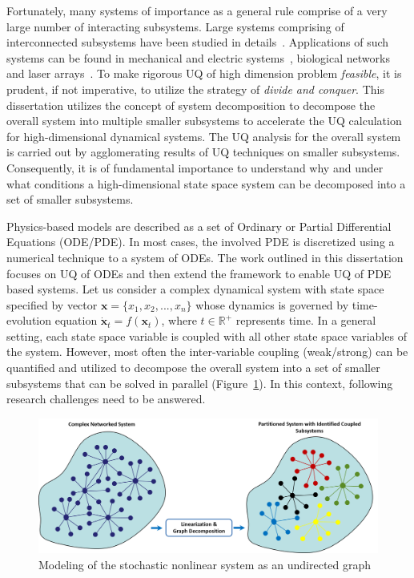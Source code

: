 Fortunately, many systems of importance as a general rule comprise of a very large number of interacting subsystems. Large systems comprising of interconnected subsystems have been studied in details~\cite{hale1997diffusive, afraimovich1997synchronization, fujisaka1983stability, martynyuk2012weakly}. Applications of such systems can be found in mechanical and electric systems~\cite{silver1967multiple, belykh1993chaotic, ji2012adaptive, georgiou2015multi}, biological networks~\cite{winfree1967biological, cohen1982nature, kopell1986symmetry, mirollo1990synchronization, ermentrout1998minimal} and laser arrays~\cite{winful1988stability, li1992preferential}. To make rigorous UQ of high dimension problem \textit{feasible}, it is prudent, if not imperative, to utilize the strategy of \textit{divide and conquer}. This dissertation utilizes the concept of system decomposition to decompose the overall system into multiple smaller subsystems to accelerate the UQ calculation for high-dimensional dynamical systems. The UQ analysis for the overall system is carried out by agglomerating results of UQ techniques on smaller subsystems. Consequently, it is of fundamental importance to understand why and under what conditions a high-dimensional state space system can be decomposed into a set of smaller subsystems. 

Physics-based models are described as a set of Ordinary or Partial Differential Equations (ODE/PDE). In most cases, the involved PDE is discretized using a numerical technique to a system of ODEs. The work outlined in this dissertation focuses on UQ of ODEs and then extend the framework to enable UQ of PDE based systems. 
Let us consider a complex dynamical system with state space specified by vector $\mathbf{x} = \{ x_1, x_2,..., x_n\}$ whose dynamics is governed by time-evolution equation $\dot{\mathbf{x}}_{t} = f(\textbf{x}_{t})$, where $t \in \mathbb{R}^+$ represents time. In a general setting, each state space variable is coupled with all other state space variables of the system. However, most often the inter-variable coupling (weak/strong) can be quantified and utilized to decompose the overall system into a set of smaller subsystems that can be solved in parallel (Figure~\ref{fig:UQframework}). In this context, following research challenges need to be answered.


\begin{figure}[H]
\centering
\includegraphics[width=\textwidth]{figures/FIG_1}
\caption{Modeling of the stochastic nonlinear system as an undirected graph}
\label{fig:UQframework}
\end{figure}

